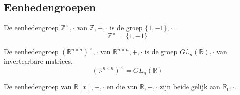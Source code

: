 \documentclass[main.tex]{subfiles}
\begin{document}

\subsection{Eenhedengroepen}
\label{sec:eenhedengroepen}

\begin{vb}
  De eenhedengroep $\mathbb{Z}^{\times},\cdot$ van $\mathbb{Z},+,\cdot$ is de groep $\{1,-1\},\cdot$.
  \[ \mathbb{Z}^{\times} = \{1,-1\}\]
\end{vb}

\begin{vb}
  De eenhedengroep $(\mathbb{R}^{n\times n})^{\times},\cdot$ van $\mathbb{R}^{n\times n},+,\cdot$ is de groep $GL_{n}(\mathbb{R}),\cdot$ van inverteerbare matrices.
  \[ (\mathbb{R}^{n\times n})^{\times} = GL_{n}(\mathbb{R}) \]
\end{vb}

\begin{vb}
  De eenhedengroep van $\mathbb{R}[x],+,\cdot$ en die van $\mathbb{R},+,\cdot$ zijn beide gelijk aan  $\mathbb{R}_{0},\cdot$.
\end{vb}

 
\end{document}
